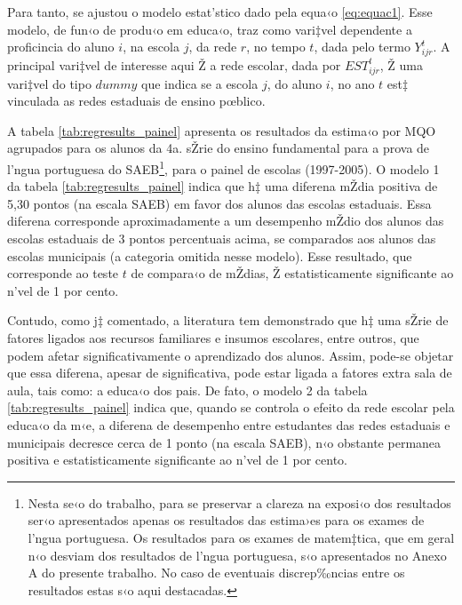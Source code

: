 \documentclass[a4paper, 12pt]{article}
\begin{document}
Para tanto, se ajustou o modelo estat’stico dado pela equa‹o \ref{eq:equac1}. Esse modelo, de fun‹o de produ‹o em educa‹o, traz como vari‡vel dependente a proficincia do aluno $i$, na escola $j$, da rede $r$, no tempo $t$, dada pelo termo $Y_{ijr}^{t}$. A principal vari‡vel de interesse aqui Ž a rede escolar, dada por $EST_{ijr}^{t}$, Ž uma vari‡vel do tipo $dummy$ que indica se a escola $j$, do aluno $i$, no ano $t$ est‡ vinculada as redes estaduais de ensino pœblico. 










A tabela \ref{tab:regresults_painel} apresenta os resultados da estima‹o por MQO agrupados para os alunos da 4a. sŽrie do ensino fundamental para a prova de l’ngua portuguesa do SAEB\footnote{Nesta se‹o do trabalho, para se preservar a clareza na exposi‹o dos resultados ser‹o apresentados apenas os resultados das estima›es para os exames de l’ngua portuguesa. Os resultados para os exames de matem‡tica, que em geral n‹o desviam dos resultados de l’ngua portuguesa, s‹o apresentados no Anexo A do presente trabalho. No caso de eventuais discrep‰ncias entre os resultados estas s‹o aqui destacadas.}, para o painel de escolas (1997-2005). O modelo 1 da tabela \ref{tab:regresults_painel} indica que h‡ uma diferena mŽdia positiva de 5,30 pontos (na escala SAEB) em favor dos alunos das escolas estaduais. Essa diferena corresponde aproximadamente a um desempenho mŽdio dos alunos das escolas estaduais de 3 pontos percentuais acima, se comparados aos alunos das escolas municipais (a categoria omitida nesse modelo).  Esse resultado, que corresponde ao teste $t$ de compara‹o de mŽdias, Ž estatisticamente significante ao n’vel de 1 por cento. 

Contudo, como j‡ comentado, a literatura tem demonstrado que h‡ uma sŽrie de fatores ligados aos recursos familiares e insumos escolares, entre outros, que podem afetar significativamente o aprendizado dos alunos. Assim, pode-se objetar que essa diferena, apesar de significativa, pode estar ligada a fatores extra sala de aula, tais como: a educa‹o dos pais. De fato, o modelo 2 da tabela \ref{tab:regresults_painel} indica que, quando se controla o efeito da rede escolar pela educa‹o da m‹e, a diferena de desempenho entre estudantes das redes estaduais e municipais decresce cerca de 1 ponto (na escala SAEB), n‹o obstante permanea positiva e estatisticamente significante ao n’vel de 1 por cento. 
\end{document}

